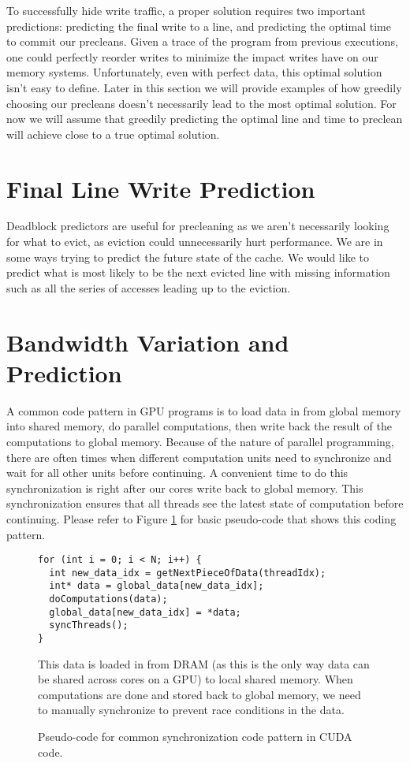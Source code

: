 To successfully hide write traffic, a proper solution requires two important predictions: predicting the final write to a line, and predicting the optimal time to commit our precleans. Given a trace of the program from previous executions, one could perfectly reorder writes to minimize the impact writes have on our memory systems. Unfortunately, even with perfect data, this optimal solution isn’t easy to define. Later in this section we will provide examples of how greedily choosing our precleans doesn’t necessarily lead to the most optimal solution. For now we will assume that greedily predicting the optimal line and time to preclean will achieve close to a true optimal solution.

\section{Final Line Write Prediction}
Deadblock predictors are useful for precleaning as we aren’t necessarily looking for what to evict, as eviction could unnecessarily hurt performance. We are in some ways trying to predict the future state of the cache. We would like to predict what is most likely to be the next evicted line with missing information such as all the series of accesses leading up to the eviction.

\section{Bandwidth Variation and Prediction}
A common code pattern in GPU programs is to load data in from global memory into shared memory, do parallel computations, then write back the result of the computations to global memory. Because of the nature of parallel programming, there are often times when different computation units need to synchronize and wait for all other units before continuing. A convenient time to do this synchronization is right after our cores write back to global memory. This synchronization ensures that all threads see the latest state of computation before continuing. Please refer to Figure \ref{f:cuda_sync} for basic pseudo-code that shows this coding pattern.

\begin{figure}[htb]
\begin{center}

\begin{lstlisting}
for (int i = 0; i < N; i++) {
  int new_data_idx = getNextPieceOfData(threadIdx);
  int* data = global_data[new_data_idx];
  doComputations(data);
  global_data[new_data_idx] = *data;
  syncThreads();
}
\end{lstlisting}
\caption{Pseudo-code for common synchronization code pattern in CUDA code.} This data is loaded in from DRAM (as this is the only way data can be shared across cores on a GPU) to local shared memory. When computations are done and stored back to global memory, we need to manually synchronize to prevent race conditions in the data.
\label{f:cuda_sync}
\end{center}
\end{figure}
%

